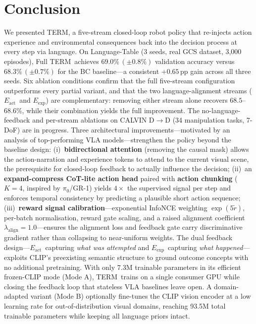 \documentclass{article}
\newcommand{\modelname}{\textsc{TERM}\xspace}
\newcommand{\Lact}{$E_{\mathrm{act}}$\xspace}
\newcommand{\Lexp}{$E_{\mathrm{exp}}$\xspace}
\begin{document}
\section{Conclusion}
\label{sec:conclusion}

We presented \modelname, a five-stream closed-loop robot policy that
re-injects action experience and environmental consequences back into
the decision process at every step via language.
On Language-Table (3 seeds, real GCS dataset, 3,000 episodes), Full \modelname\
achieves $69.0\%\,(\pm0.8\%)$ validation accuracy versus $68.3\%\,(\pm0.7\%)$
for the BC baseline---a consistent $+0.65$\,pp gain across all three seeds.
Six ablation conditions confirm that the full five-stream configuration
outperforms every partial variant, and that the two language-alignment streams
(\Lact\ and \Lexp) are complementary: removing either stream alone
recovers $68.5$--$68.6\%$, while their combination yields the full improvement.
The no-language-feedback and per-stream ablations on CALVIN D$\to$D
(34 manipulation tasks, 7-DoF) are in progress.
Three architectural improvements---motivated by an analysis of top-performing
VLA models---strengthen the policy beyond the baseline design:
(i)~\textbf{bidirectional attention} (removing the causal mask) allows
the action-narration and experience tokens to attend to the current visual
scene, the prerequisite for closed-loop feedback to actually influence the
decision;
(ii)~an \textbf{expand-compress CoT-lite action head} paired with
\textbf{action chunking} ($K{=}4$, inspired by $\pi_0$/GR-1) yields
$4{\times}$ the supervised signal per step and enforces temporal
consistency by predicting a plausible short action sequence;
(iii)~\textbf{reward signal calibration}---exponential InfoNCE weighting
$\exp(5\tilde{r})$, per-batch normalisation, reward gate scaling, and
a raised alignment coefficient $\lambda_{\mathrm{align}}{=}1.0$---ensures
the alignment loss and feedback gate carry discriminative gradient rather
than collapsing to near-uniform weights.
The dual feedback design---\Lact\ capturing \emph{what was attempted} and
\Lexp\ capturing \emph{what happened}---exploits CLIP's preexisting
semantic structure to ground outcome concepts with no additional pretraining.
With only 7.3M trainable parameters in its efficient frozen-CLIP mode
(Mode A), \modelname\ trains on a single consumer GPU while closing the
feedback loop that stateless VLA baselines leave open.
A domain-adapted variant (Mode B) optionally fine-tunes the CLIP vision
encoder at a low learning rate for out-of-distribution visual domains,
reaching 93.5M total trainable parameters while keeping all language priors
intact.
\end{document}
